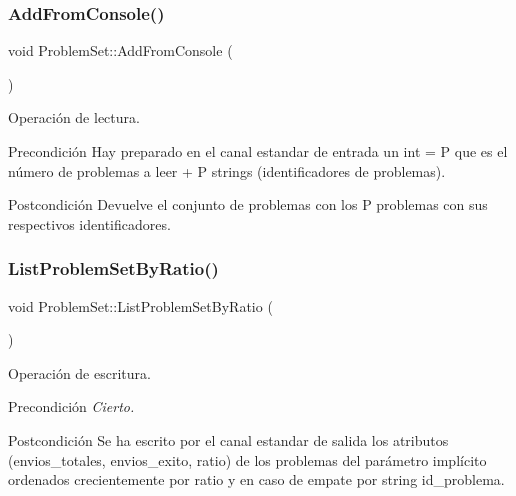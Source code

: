 \subsubsection{\texorpdfstring{Add\+From\+Console()}{AddFromConsole()}}
{\footnotesize\ttfamily void Problem\+Set\+::\+Add\+From\+Console (\begin{DoxyParamCaption}{ }\end{DoxyParamCaption})}



Operación de lectura. 

\begin{DoxyPrecond}{Precondición}
Hay preparado en el canal estandar de entrada un int = P que es el número de problemas a leer + P strings (identificadores de problemas). 
\end{DoxyPrecond}
\begin{DoxyPostcond}{Postcondición}
Devuelve el conjunto de problemas con los P problemas con sus respectivos identificadores. 
\end{DoxyPostcond}
\mbox{\label{class_problem_set_ab45006ff08ba3c36bc3c08a427391b69}} 
\subsubsection{\texorpdfstring{List\+Problem\+Set\+By\+Ratio()}{ListProblemSetByRatio()}}
{\footnotesize\ttfamily void Problem\+Set\+::\+List\+Problem\+Set\+By\+Ratio (\begin{DoxyParamCaption}{ }\end{DoxyParamCaption})}



Operación de escritura. 

\begin{DoxyPrecond}{Precondición}
{\itshape Cierto.} 
\end{DoxyPrecond}
\begin{DoxyPostcond}{Postcondición}
Se ha escrito por el canal estandar de salida los atributos (envios\+\_\+totales, envios\+\_\+exito, ratio) de los problemas del parámetro implícito ordenados crecientemente por ratio y en caso de empate por string id\+\_\+problema. 
\end{DoxyPostcond}
\mbox{\label{class_problem_set_a7ef02642813914f7ca93c93835ddcda3}} 
